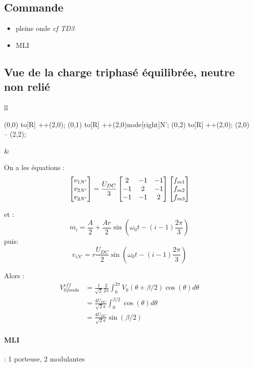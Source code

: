 \documentclass[main.tex]{subfiles}
\begin{document}
\subsection{Commande}
\begin{itemize}
\item pleine onde
  \emph{cf TD3}
\item MLI
\end{itemize}

\subsection{Vue de la charge triphasé équilibrée, neutre non relié}
\begin{center}

\begin{tabular}{ll}
  \begin{minipage}[h]{0.3\linewidth}

\begin{circuitikz}
  \draw (0,0) to[R] ++(2,0);
  \draw (0,1) to[R] ++(2,0)node[right]{N'};
  \draw (0,2) to[R] ++(2,0);
  \draw (2,0) -- (2,2);
\end{circuitikz}
\end{minipage}
&
                  \begin{minipage}{0.5\linewidth}
On a les équations :
\[
  \begin{bmatrix} v_{1N'} \\  v_{2N'} \\v_{2N'} \end{bmatrix} = \frac{U_{DC}}{3}
  \begin{bmatrix}
    2& -1 &-1 \\
    -1 &2 &-1 \\
    -1& -1&2
  \end{bmatrix}
  \begin{bmatrix} f_{m1} \\f_{m2}\\f_{m3} \end{bmatrix}
\]
\end{minipage}

\end{tabular}
\end{center}

et :
\[
m_i = \frac{A}{2}+\frac{Ar}{2}\sin\left(\omega_0t-(i-1)\frac{2\pi}{3}\right)
\]
puis:
\[
  v_{iN'} = r
  \frac{U_{DC}}{2}
  \sin\left(\omega_0t-(i-1)\frac{2\pi}{3}\right)
\]

Alors :
\begin{align*}
  V_{0fonda}^{eff} &= \frac{1}{\sqrt{2}}\frac{2}{2\pi}\int_{0}^{2\pi}V_0(\theta+\beta/2)\cos(\theta)d\theta\\
                   &=\frac{4U_{DC}}{\sqrt{2}\pi}\int_{0}^{\beta/2}\cos(\theta)d\theta\\
                   &=\frac{4U_{DC}}{\sqrt{2}\pi} \sin(\beta/2)
\end{align*}
\paragraph{MLI}:
  1 porteuse, 2 modulantes
\end{document}
